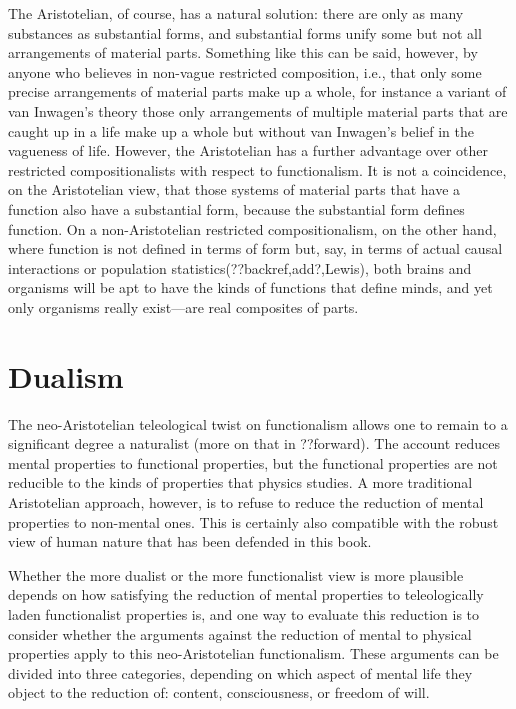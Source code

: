 The Aristotelian, of course, has a natural solution: there are only as many substances as substantial forms, and 
substantial forms unify some but not all arrangements of material parts. Something like this can be said, however,
by anyone who believes in non-vague restricted composition, i.e., that only some precise arrangements of material parts 
make up a whole, for instance a variant of van Inwagen's theory those only arrangements of multiple material parts that are 
caught up in a life make up a whole but without van Inwagen's belief in the vagueness of life. However, the Aristotelian
has a further advantage over other restricted compositionalists with respect to functionalism. It is not a coincidence, 
on the Aristotelian view, that those systems of material parts that have a function also have a substantial form, because 
the substantial form defines function. On a non-Aristotelian restricted compositionalism, on the other hand, where 
function is not defined in terms of form but, say, in terms of actual causal interactions or population statistics(??backref,add?,Lewis),
both brains and organisms will be apt to have the kinds of functions that define minds, and yet only organisms 
really exist---are real composites of parts. 

\section{Dualism}\label{sec:dualism}
The neo-Aristotelian teleological twist on functionalism allows one to remain to a significant degree a naturalist (more on that
in ??forward). The account reduces mental properties to functional properties, but the functional properties are not 
reducible to the kinds of properties that physics studies. A more traditional Aristotelian approach, however, is to refuse
to reduce the reduction of mental properties to non-mental ones. This is certainly also compatible with the robust view of
human nature that has been defended in this book. 

Whether the more dualist or the more functionalist view is more plausible depends on how satisfying the reduction of mental
properties to teleologically laden functionalist properties is, and one way to evaluate this reduction is to consider
whether the arguments against the reduction of mental to physical properties apply to this neo-Aristotelian functionalism.
These arguments can be divided into three categories, depending on which aspect of mental life they object to the reduction
of: content, consciousness, or freedom of will. 

